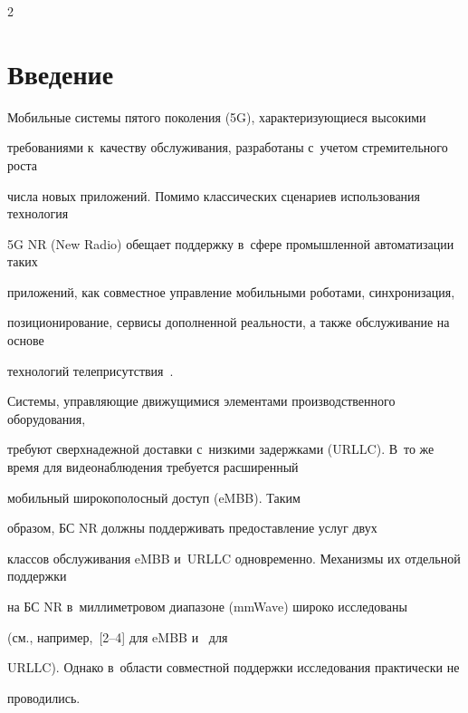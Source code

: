 \begin{multicols}{2}





\label{st\stat}





    


\section{Введение}







Мобильные системы пятого поколения (5G), характеризующиеся высокими 


требованиями к~качеству обслуживания, разработаны с~учетом стремительного роста 


числа новых приложений. Помимо классических сценариев использования технология 


5G NR (New Radio) обещает поддержку в~сфере промышленной автоматизации таких 


приложений, как совместное управление мобильными роботами, синхронизация, 


позиционирование, сервисы дополненной реальности, а также обслуживание на основе 


технологий телеприсутствия~\cite{ghosh2019industrial}.





Системы, управляющие движущимися элементами производственного оборудования, 


требуют сверхнадежной доставки с~низкими задержками (URLLC). В~то же время для видеонаблюдения требуется расширенный 


мобильный широкополосный доступ (eMBB). Таким 


образом, БС NR должны поддерживать предоставление услуг двух 


классов обслуживания eMBB и~URLLC одновременно. Механизмы их отдельной поддержки 


на БС NR в~миллиметровом диапазоне (mmWave) широко исследованы 


(см., например,~[2--4] для eMBB и~\cite{rao2018packet, mahmood2019resource} для 


URLLC). Однако в~об\-ласти совместной поддержки исследования практически не 


проводились.






\end{multicols}
